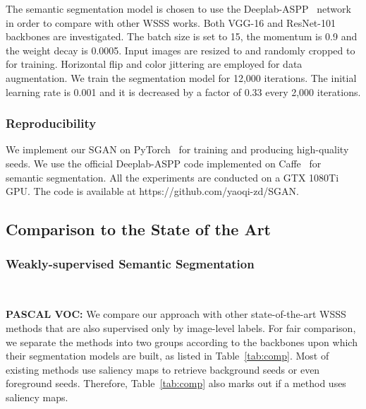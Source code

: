 \documentclass[journal]{IEEEtran}
\begin{document}
The semantic segmentation model is chosen to use the Deeplab-ASPP~\cite{chen2017deeplab} network in order to compare with other WSSS works. Both VGG-16 and ResNet-101 backbones are investigated. The batch size is set to 15, the momentum is 0.9 and the weight decay is 0.0005. Input images are resized to  and randomly cropped to  for training. Horizontal flip and color jittering are employed for data augmentation. We train the segmentation model for 12,000 iterations. The initial learning rate is 0.001 and it is decreased by a factor of 0.33 every 2,000 iterations. 

\subsubsection{Reproducibility} We implement our SGAN on PyTorch~\cite{paszke2017automatic} for training and producing high-quality seeds. We use the official Deeplab-ASPP code implemented on Caffe~\cite{jia2014caffe} for semantic segmentation. All the experiments are conducted on a GTX 1080Ti GPU. The code is available at https://github.com/yaoqi-zd/SGAN.

\subsection{Comparison to the State of the Art}
\subsubsection{Weakly-supervised Semantic Segmentation}\

\textbf{PASCAL VOC:} We compare our approach with other state-of-the-art WSSS methods that are also supervised only by image-level labels. For fair comparison, we separate the methods into two groups according to the backbones upon which their segmentation models are built, as listed in Table~\ref{tab:comp}. Most of existing methods use saliency maps to retrieve background seeds or even foreground seeds. Therefore, Table~\ref{tab:comp} also marks out if a method uses saliency maps. 
\end{document}
